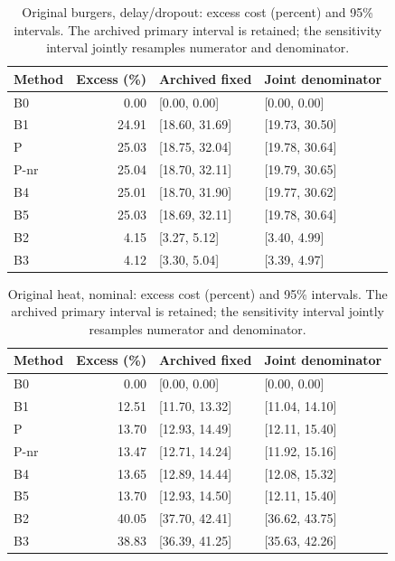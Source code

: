 \begin{table}[ht]
\caption{Original burgers, delay/dropout: excess cost (percent) and 95\% intervals. The archived primary interval is retained; the sensitivity interval jointly resamples numerator and denominator.}\label{tab:joint_burgers_locked_delay_dropout}
\centering\small
\begin{tabular}{@{}lrll@{}}\toprule
Method & Excess (\%) & Archived fixed & Joint denominator\\\midrule
B0 & 0.00 & [0.00, 0.00] & [0.00, 0.00] \\
B1 & 24.91 & [18.60, 31.69] & [19.73, 30.50] \\
P & 25.03 & [18.75, 32.04] & [19.78, 30.64] \\
P-nr & 25.04 & [18.70, 32.11] & [19.79, 30.65] \\
B4 & 25.01 & [18.70, 31.90] & [19.77, 30.62] \\
B5 & 25.03 & [18.69, 32.11] & [19.78, 30.64] \\
B2 & 4.15 & [3.27, 5.12] & [3.40, 4.99] \\
B3 & 4.12 & [3.30, 5.04] & [3.39, 4.97] \\
\bottomrule\end{tabular}
\end{table}
\begin{table}[ht]
\caption{Original heat, nominal: excess cost (percent) and 95\% intervals. The archived primary interval is retained; the sensitivity interval jointly resamples numerator and denominator.}\label{tab:joint_heat_locked_nominal}
\centering\small
\begin{tabular}{@{}lrll@{}}\toprule
Method & Excess (\%) & Archived fixed & Joint denominator\\\midrule
B0 & 0.00 & [0.00, 0.00] & [0.00, 0.00] \\
B1 & 12.51 & [11.70, 13.32] & [11.04, 14.10] \\
P & 13.70 & [12.93, 14.49] & [12.11, 15.40] \\
P-nr & 13.47 & [12.71, 14.24] & [11.92, 15.16] \\
B4 & 13.65 & [12.89, 14.44] & [12.08, 15.32] \\
B5 & 13.70 & [12.93, 14.50] & [12.11, 15.40] \\
B2 & 40.05 & [37.70, 42.41] & [36.62, 43.75] \\
B3 & 38.83 & [36.39, 41.25] & [35.63, 42.26] \\
\bottomrule\end{tabular}
\end{table}

